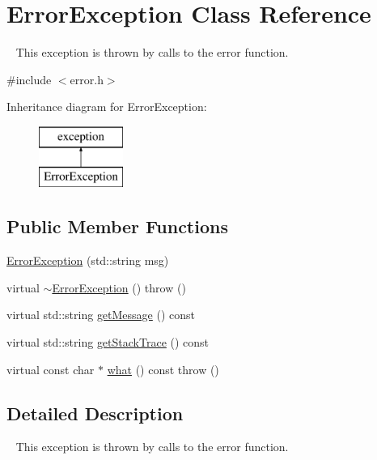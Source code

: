 \hypertarget{classErrorException}{}\section{Error\+Exception Class Reference}
\label{classErrorException}


~\newline
 This exception is thrown by calls to the {\ttfamily error} function.  




{\ttfamily \#include $<$error.\+h$>$}

Inheritance diagram for Error\+Exception\+:\begin{figure}[H]
\begin{center}
\leavevmode
\includegraphics[height=2.000000cm]{classErrorException}
\end{center}
\end{figure}
\subsection*{Public Member Functions}
\begin{DoxyCompactItemize}
\item 
\mbox{\hyperlink{classErrorException_a4f422b01fff7cc16eea81e00638f44d2}{Error\+Exception}} (std\+::string msg)
\item 
virtual \mbox{\hyperlink{classErrorException_a8a69609bdba32e156392e54dadadcb18}{$\sim$\+Error\+Exception}} ()  throw ()
\item 
virtual std\+::string \mbox{\hyperlink{classErrorException_a1c1cc72e6e4257dbd29ff04a23973008}{get\+Message}} () const
\item 
virtual std\+::string \mbox{\hyperlink{classErrorException_a79ec2353dbf71c4867c65c6c6df5dfce}{get\+Stack\+Trace}} () const
\item 
virtual const char $\ast$ \mbox{\hyperlink{classErrorException_a8d4b96162e93e11e5816d83702578af8}{what}} () const  throw ()
\end{DoxyCompactItemize}


\subsection{Detailed Description}
~\newline
 This exception is thrown by calls to the {\ttfamily error} function. 

